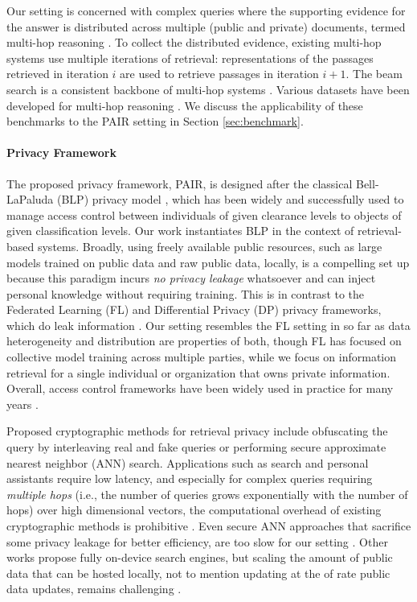 \documentclass{article}
\renewcommand\cite{\citep}	\newcommand\shortcite{\citeyearpar}\newcommand\newcite{\citet}
\newcommand{\problemshortname}{\textsc{PAIR}\xspace}
\begin{document}
Our setting is concerned with complex queries where the supporting evidence for the answer is distributed across multiple (public and private) documents, termed multi-hop reasoning \cite{welbl2018mhtask}.
To collect the distributed evidence, existing multi-hop systems use multiple iterations of retrieval: representations of the passages retrieved in iteration $i$ are used to retrieve passages in iteration $i+1$. The beam search is a consistent backbone of multi-hop systems \cite{miller2016kvm, feldman2019multihop, asai2020graphpathsqa, wolfson2020break, xiong2021mdr, qi2021irrrqa, khattab2021baleen}. Various datasets have been developed for multi-hop reasoning \cite{yang2018hotpotqa, talmor2018complexwebqa}. We discuss the applicability of these benchmarks to the \problemshortname setting in Section \ref{sec:benchmark}. 

\paragraph{Privacy Framework} The proposed privacy framework, \problemshortname, is designed after the classical Bell-LaPaluda (BLP) privacy model  \cite{bell2976blm}, which has been widely and successfully used to manage access control between individuals of given clearance levels to objects of given classification levels. Our work instantiates BLP in the context of retrieval-based systems. Broadly, using freely available public resources, such as large models trained on public data and raw public data, locally, is a compelling set up because this paradigm incurs \textit{no privacy leakage} whatsoever and can inject personal knowledge without requiring training. This is in contrast to the Federated Learning (FL) \cite{mcmahan2016fl} and Differential Privacy (DP) \cite{dwork2006dp} privacy frameworks, which do leak information \cite{shokri2017meminference, nasr2019meminference}. Our setting resembles the FL setting in so far as data heterogeneity and distribution are properties of both, though FL has focused on collective model training across multiple parties, while we focus on information retrieval for a single individual or organization that owns private information. 
Overall, access control frameworks have been widely used in practice for many years \cite{hu2006nist}.


Proposed cryptographic methods for retrieval privacy include obfuscating the query by interleaving real and fake queries \cite{gervais2014queryobfusc} or performing
secure approximate nearest neighbor (ANN) search.
Applications such as search and personal assistants require low latency, and especially for complex queries requiring \textit{multiple hops} (i.e., the number of queries grows exponentially with the number of hops) over high dimensional vectors, the computational overhead of existing cryptographic methods is prohibitive \cite{zuber2021privatenn, chen2019privatennsanns}. Even secure ANN approaches that sacrifice some privacy leakage for better efficiency, are too slow for our setting \cite{schreiber2021PrivateNN}.
Other works propose fully on-device search engines, but scaling the amount of public data that can be hosted locally, not to mention updating at the of rate public data updates, remains challenging \cite{cao2019deqa}.
\end{document}
